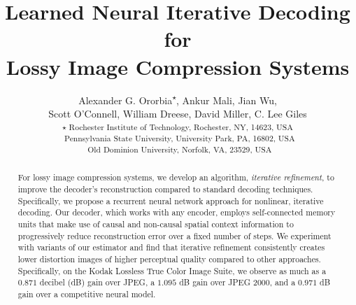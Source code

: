 \documentclass[smallabstract,smallcaptions]{dccpaper}
\begin{document}
\title{\bf Learned Neural Iterative Decoding for \\Lossy Image Compression Systems}
\author{Alexander G. Ororbia\textsuperscript{$\star$},
Ankur Mali\textsuperscript{\textdagger},
Jian Wu\textsuperscript{\textdaggerdbl},\\
Scott O'Connell\textsuperscript{\textdagger},
William Dreese\textsuperscript{\textdagger},
David Miller\textsuperscript{\textdagger},
C. Lee Giles\textsuperscript{\textdagger}\\ [0.5em]
\textsuperscript{$\star$ Rochester Institute of Technology, Rochester, NY, 14623, USA}\\
\textsuperscript{\textdagger\ Pennsylvania State University, University Park, PA, 16802, USA}\\
\textsuperscript{\textdaggerdbl\ Old Dominion University, Norfolk, VA, 23529, USA}
}
\maketitle
\thispagestyle{empty}
\setcounter{page}{1}


\begin{abstract}
For lossy image compression systems, we develop an algorithm, \emph{iterative refinement}, to improve the decoder's reconstruction compared to standard decoding techniques. Specifically, we propose a recurrent neural network approach for nonlinear, iterative decoding. Our decoder, which works with any encoder, employs self-connected memory units that make use of causal and non-causal spatial context information to progressively reduce reconstruction error over a fixed number of steps. We experiment with variants of our estimator and find that iterative refinement consistently creates lower distortion images of higher perceptual quality compared to other approaches. Specifically, on the Kodak Lossless True Color Image Suite, we observe as much as a $0.871$ decibel (dB) gain over JPEG, a $1.095$ dB gain over JPEG 2000, and a $0.971$ dB gain over a competitive neural model.
\end{abstract}
\end{document}
